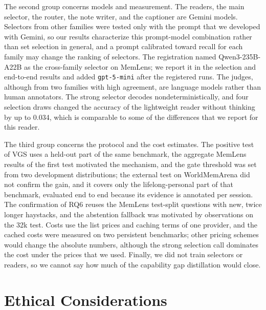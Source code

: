 The second group concerns models and measurement. The readers, the main selector, the router, the note writer, and the captioner are Gemini models. Selectors from other families were tested only with the prompt that we developed with Gemini, so our results characterize this prompt-model combination rather than set selection in general, and a prompt calibrated toward recall for each family may change the ranking of selectors. The registration named Qwen3-235B-A22B as the cross-family selector on MemLens; we report it in the selection and end-to-end results and added \texttt{gpt-5-mini} after the registered runs. The judges, although from two families with high agreement, are language models rather than human annotators. The strong selector decodes nondeterministically, and four selection draws changed the accuracy of the lightweight reader without thinking by up to 0.034, which is comparable to some of the differences that we report for this reader.

The third group concerns the protocol and the cost estimates. The positive test of VGS uses a held-out part of the same benchmark, the aggregate MemLens results of the first test motivated the mechanism, and the gate threshold was set from two development distributions; the external test on WorldMemArena did not confirm the gain, and it covers only the lifelong-personal part of that benchmark, evaluated end to end because its evidence is annotated per session. The confirmation of RQ6 reuses the MemLens test-split questions with new, twice longer haystacks, and the abstention fallback was motivated by observations on the 32k test. Costs use the list prices and caching terms of one provider, and the cached costs were measured on two persistent benchmarks; other pricing schemes would change the absolute numbers, although the strong selection call dominates the cost under the prices that we used. Finally, we did not train selectors or readers, so we cannot say how much of the capability gap distillation would close.

\section{Ethical Considerations}
\label{sec:ethics}

